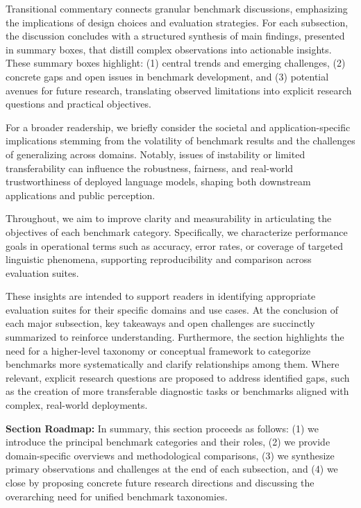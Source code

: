 \documentclass[sigconf]{acmart}
\begin{document}
Transitional commentary connects granular benchmark discussions, emphasizing the implications of design choices and evaluation strategies. For each subsection, the discussion concludes with a structured synthesis of main findings, presented in summary boxes, that distill complex observations into actionable insights. These summary boxes highlight: (1) central trends and emerging challenges, (2) concrete gaps and open issues in benchmark development, and (3) potential avenues for future research, translating observed limitations into explicit research questions and practical objectives.

For a broader readership, we briefly consider the societal and application-specific implications stemming from the volatility of benchmark results and the challenges of generalizing across domains. Notably, issues of instability or limited transferability can influence the robustness, fairness, and real-world trustworthiness of deployed language models, shaping both downstream applications and public perception.

Throughout, we aim to improve clarity and measurability in articulating the objectives of each benchmark category. Specifically, we characterize performance goals in operational terms such as accuracy, error rates, or coverage of targeted linguistic phenomena, supporting reproducibility and comparison across evaluation suites.

These insights are intended to support readers in identifying appropriate evaluation suites for their specific domains and use cases. At the conclusion of each major subsection, key takeaways and open challenges are succinctly summarized to reinforce understanding. Furthermore, the section highlights the need for a higher-level taxonomy or conceptual framework to categorize benchmarks more systematically and clarify relationships among them. Where relevant, explicit research questions are proposed to address identified gaps, such as the creation of more transferable diagnostic tasks or benchmarks aligned with complex, real-world deployments.

\textbf{Section Roadmap:} In summary, this section proceeds as follows: (1) we introduce the principal benchmark categories and their roles, (2) we provide domain-specific overviews and methodological comparisons, (3) we synthesize primary observations and challenges at the end of each subsection, and (4) we close by proposing concrete future research directions and discussing the overarching need for unified benchmark taxonomies.
\end{document}
